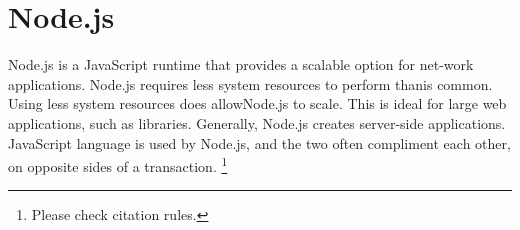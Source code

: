 \section{Node.js}


Node.js is a JavaScript runtime that provides a scalable 
option for net-work applications. Node.js requires less 
system resources to perform thanis common. 
\cite{hid-sp18-525-nodejs} Using less system resources does 
allowNode.js to scale. This is ideal for large web 
applications, such as libraries. \cite{hid-sp18-525-nodejs} 
Generally, Node.js creates server-side applications. 
\cite{hid-sp18-525-nodejs} JavaScript language is used by 
Node.js, and the two often compliment each
other, on opposite sides of a transaction. 
\cite{hid-sp18-525-nodejs}\footnote{Please check citation rules.}
